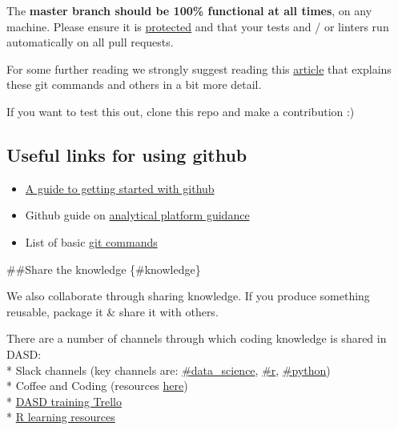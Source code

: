 \documentclass[]{book}
\providecommand{\tightlist}{%
  \setlength{\itemsep}{0pt}\setlength{\parskip}{0pt}}
\begin{document}
The \textbf{master branch should be 100\% functional at all times}, on any machine. Please ensure it is \href{https://help.github.com/articles/about-protected-branches/}{protected} and that your tests and / or linters run automatically on all pull requests.

For some further reading we strongly suggest reading this \href{https://gist.github.com/blackfalcon/8428401}{article} that explains these git commands and others in a bit more detail.

If you want to test this out, clone this repo and make a contribution :)

\hypertarget{gitlink}{%
\subsection*{Useful links for using github}\label{gitlink}}

\begin{itemize}
\tightlist
\item
  \href{https://jennybc.github.io/2014-05-12-ubc/ubc-r/session2.4_github.html}{A guide to getting started with github}\\
\item
  Github guide on \href{https://user-guidance.services.alpha.mojanalytics.xyz/github.html\#creating-your-project-repo-on-github}{analytical platform guidance}\\
\item
  List of basic \href{https://guides.github.com/introduction/git-handbook/}{git commands}
\end{itemize}

\#\#Share the knowledge \{\#knowledge\}

We also collaborate through sharing knowledge. If you produce something reusable, package it \& share it with others.

There are a number of channels through which coding knowledge is shared in DASD:\\
* Slack channels (key channels are: \href{https://app.slack.com/client/T1PU1AP6D/C1Z8Q18LS}{\#data\_science}, \href{https://app.slack.com/client/T1PU1AP6D/C1PUCG719}{\#r}, \href{https://app.slack.com/client/T1PU1AP6D/C1Q09V86S}{\#python})\\
* Coffee and Coding (resources \href{https://github.com/moj-analytical-services/Coffee-and-Coding}{here})\\
* \href{https://trello.com/b/zAwm6sCc/dasd-training}{DASD training Trello}\\
* \href{https://docs.google.com/document/d/1R4hBMf26T9HEnCdVz56PpZhwiCv5RhberYL3BxOSKsA/edit}{R learning resources}
\end{document}
